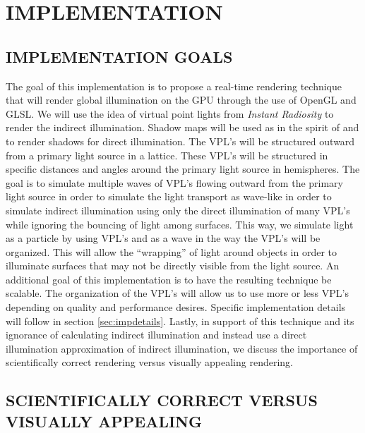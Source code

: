 \chapter{IMPLEMENTATION}

\section{IMPLEMENTATION GOALS} \label{sec:impgoals}

The goal of this implementation is to propose a real-time rendering technique that will render global illumination on the GPU through the use of OpenGL and GLSL.  We will use the idea of virtual point lights from \textit{Instant Radiosity} \cite{Keller1997} to render the indirect illumination.  Shadow maps will be used as in the spirit of \cite{Williams1978} and \cite{Reeves1987} to render shadows for direct illumination.  The VPL's will be structured outward from a primary light source in a lattice.  These VPL's will be structured in specific distances and angles around the primary light source in hemispheres. The goal is to simulate multiple waves of VPL's flowing outward from the primary light source in order to simulate the light transport as wave-like in order to simulate indirect illumination using only the direct illumination of many VPL's while ignoring the bouncing of light among surfaces.  This way, we simulate light as a particle by using VPL's and as a wave in the way the VPL's will be organized.  This will allow the “wrapping” of light around objects in order to illuminate surfaces that may not be directly visible from the light source.  An additional goal of this implementation is to have the resulting technique be scalable.  The organization of the VPL's will allow us to use more or less VPL's depending on quality and performance desires.  Specific implementation details will follow in section \ref{sec:impdetails}.  Lastly, in support of this technique and its ignorance of calculating indirect illumination and instead use a direct illumination approximation of indirect illumination, we discuss the importance of scientifically correct rendering versus visually appealing rendering.

\section{SCIENTIFICALLY CORRECT VERSUS VISUALLY APPEALING}

